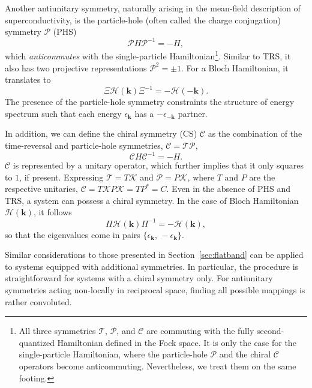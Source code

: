 Another antiunitary symmetry, naturally arising in the mean-field description of superconductivity, is the particle-hole (often called the charge conjugation) symmetry $\mathcal{P}$ (PHS)
\begin{equation}
\mathcal{P}  H \mathcal{P}^{-1} = - H,
\label{eq:PHS}
\end{equation}
which \emph{anticommutes} with the single-particle Hamiltonian\footnote{All three symmetries $\mathcal{T}$, $\mathcal{P}$, and $\mathcal{C}$ are commuting with the fully second-quantized Hamiltonian defined in the Fock space. It is only the case for the single-particle Hamiltonian, where the particle-hole $\mathcal{P}$ and the chiral $\mathcal{C}$ operators become anticommuting. Nevertheless, we treat them on the same footing.}. Similar to TRS, it also has two projective representations $\mathcal{P}^2 = \pm 1$. For a Bloch Hamiltonian, it translates to
\begin{equation}
\Xi  \mathcal{H} (\mathbf{k})  \Xi^{-1} = - \mathcal{H} (- \mathbf{k}).
\label{eq:PHS-k}
\end{equation}
The presence of the particle-hole symmetry constraints the structure of energy spectrum such that each energy $\epsilon_{\mathbf{k}}$ has a $-\epsilon_{-\mathbf{k}}$ partner.

In addition, we can define the chiral symmetry (CS) $\mathcal{C}$ as the combination of the time-reversal and particle-hole symmetries, $\mathcal{C}= \mathcal{TP}$,
\begin{equation}
\mathcal{C}  H \mathcal{C}^{-1} = - H.
\label{eq:CS}
\end{equation}
$\mathcal{C}$ is represented by a unitary operator, which further implies that it only squares to $1$, if present. Expressing $\mathcal{T} = T \mathcal{K}$ and $\mathcal{P} = P \mathcal{K}$, where $T$ and $P$ are the respective unitaries, $\mathcal{C} = T \mathcal{K} P \mathcal{K}  = T P^* = C$. Even in the absence of PHS and TRS, a system can possess a chiral symmetry. In the case of Bloch Hamiltonian $\mathcal{H }( \mathbf{k})$, it follows 
\begin{equation}
\Pi \mathcal{H}(\mathbf{k})  \Pi^{-1} = -  \mathcal{H }( \mathbf{k}),
\label{eq:CS-k}
\end{equation}
so that the eigenvalues come in pairs $\lbrace \epsilon_{\mathbf{k}}, \, - \epsilon_{\mathbf{k}} \rbrace$.

Similar considerations to those presented in Section~\ref{sec:flatband} can be applied to systems equipped with additional symmetries. In particular, the procedure is straightforward for systems with a chiral symmetry only. For antiunitary symmetries acting non-locally in reciprocal space, finding all possible mappings is rather convoluted.

